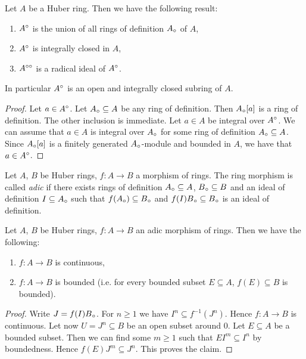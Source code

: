 \begin{prop}
Let $A$ be a Huber ring. Then we have the following result:
\begin{enumerate}
\item $A{^{\circ}}$ is the union of all rings of definition  $A{_{\circ}}$ of $A$,
\item $A{^{\circ}}$  is integrally closed in $A$,
\item $A^{\circ\circ}$ is a radical ideal of $A{^{\circ}}$.
\end{enumerate}
In particular $A{^{\circ}}$ is an open and integrally closed subring of $A$.
\end{prop}
\begin{proof}
Let $a\in A{^{\circ}}$. Let $A{_{\circ}}\subseteq A$ be any ring of definition. Then $A{_{\circ}}[a]$ is a ring of definition. The other inclusion is immediate.
Let $a\in A$ be integral over $A{^{\circ}}$. We can assume that $a\in A$ is integral over $A{_{\circ}}$ for some ring of definition $A{_{\circ}}\subseteq A$.
Since $A{_{\circ}}[a]$ is a finitely generated $A{_{\circ}}$-module and bounded in $A$, we have that $a\in A{^{\circ}}$.
\end{proof}


\begin{definition}
Let $A$, $B$ be Huber rings, $f\colon A\to B$ a morphism of rings. The ring morphism is called \emph{adic} if there exists rings of definition $A{_{\circ}}\subseteq A$, $B{_{\circ}}\subseteq B$ 
and an ideal of definition $I\subseteq A{_{\circ}}$ such that $f(A{_{\circ}})\subseteq B{_{\circ}}$ and $f(I)B{_{\circ}}\subseteq B{_{\circ}}$ is an ideal of definition.
\end{definition}


\begin{prop}
Let $A$, $B$ be Huber rings, $f\colon A\to B$ an adic morphism of rings. Then we have the following:
\begin{enumerate}
\item $f\colon A\to B$ is continuous,
\item $f\colon A\to B$ is bounded (i.e. for every bounded subset $E\subseteq A$, $f(E)\subseteq B$ is bounded).
\end{enumerate}
\end{prop}
\begin{proof}
Write $J=f(I)B{_{\circ}}$. For $n\geq1$ we have $I^n\subseteq f^{-1}(J^n)$. Hence $f\colon A\to B$ is continuous.
Let now $U=J^n\subseteq B$ be an open subset around $0$.
Let $E\subseteq A$ be a bounded subset. Then we can find some $m\geq 1$ such that $EI^m\subseteq I^n$ by boundedness.
Hence $f(E)J^m\subseteq J^n$.
This proves the claim.
\end{proof}


